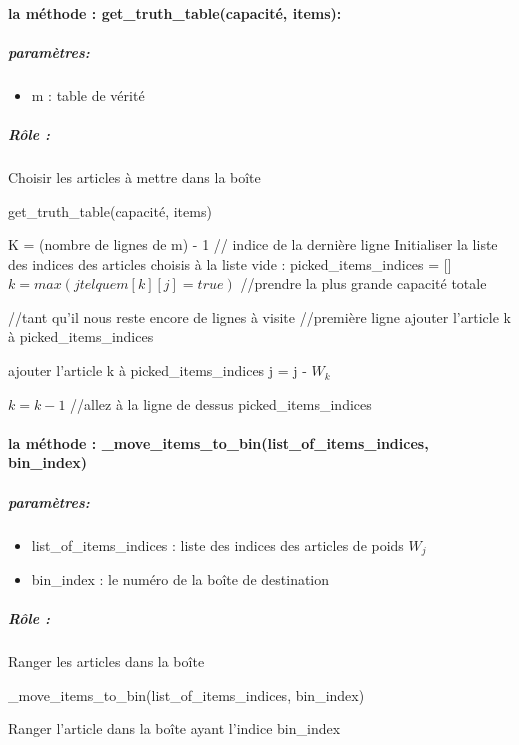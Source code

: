 \documentclass[12pt]{article}
\begin{document}
 \paragraph{la méthode : get\_truth\_table(capacité, items):}
\subparagraph{paramètres:}
\begin{itemize}
    \item m : table de vérité
\end{itemize}
\subparagraph{Rôle :}
Choisir les articles à mettre dans la boîte 
\begin{algorithm}[H]
    \caption{get\_truth\_table(capacité, items)}
    \begin{algorithmic} 
    \STATE K = (nombre de lignes de m) - 1 // indice de la dernière ligne
    \STATE Initialiser la liste des indices des articles choisis à la liste vide : picked\_items\_indices = []
        \STATE $k = max( j tel que m[k][j]=true)$ //prendre la plus grande capacité totale
          
    \ENDIF
        \STATE //tant qu’il nous reste encore de lignes à visite
                \STATE //première ligne
                \STATE ajouter l’article k à picked\_items\_indices
               
            \ELSE
                    \STATE ajouter l’article k à picked\_items\_indices
                    \STATE j = j - $W_k$

                \ENDIF
            \ENDIF
            \STATE  $k = k-1$ //allez à la ligne de dessus      
   \ENDWHILE
    \RETURN picked\_items\_indices
    \end{algorithmic} 
 \end{algorithm}
 \paragraph{la méthode : \_move\_items\_to\_bin(list\_of\_items\_indices, bin\_index)}
 \subparagraph{paramètres:}
 \begin{itemize}
     \item list\_of\_items\_indices : liste des indices des articles de poids $W_j$
     \item bin\_index : le numéro de la boîte de destination
 \end{itemize}
 \subparagraph{Rôle :}
 Ranger les articles dans la boîte 
 \begin{algorithm}[h!]
     \caption{ \_move\_items\_to\_bin(list\_of\_items\_indices, bin\_index)}
     \begin{algorithmic} 
            \STATE Ranger l’article dans la boîte ayant l’indice bin\_index
        \ENDFOR
    
    \end{algorithmic} 
  \end{algorithm}
\end{document}
